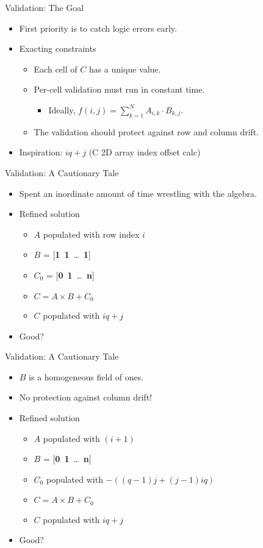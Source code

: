 \documentclass{beamer}
\begin{document}
\begin{frame}{Validation: The Goal}
  \begin{itemize}
  \item{First priority is to catch logic errors early.}
  \item{Exacting constraints}
    \begin{itemize}
    \item{Each cell of $C$ has a unique value.}
    \item{Per-cell validation must run in constant time.}
      \begin{itemize}
        \item{Ideally, $f(i,j) = \displaystyle\sum_{k=1}^{N} A_{i,k} \cdot B_{k,j}$.}
      \end{itemize}
    \item{The validation should protect against row and column drift.}
    \end{itemize}
  \item{Inspiration: $iq +j$ (C 2D array index offset calc\autocite[][113]{KnR})}
  \end{itemize}
\end{frame}
\begin{frame}{Validation: A Cautionary Tale}
  \begin{itemize}
  \item{Spent an inordinate amount of time wrestling with the algebra.}
  \item{Refined solution}
    \begin{itemize}
    \item{$A$ populated with row index $i$}
    \item{$B$ = [\textbf{1}\ \textbf{1}\ \ldots\ \textbf{1}]}
    \item{$C_{0}$ = [\textbf{0}\ \textbf{1}\ \ldots\ \textbf{n}]}
    \item{$C = A \times B + C_{0}$}
    \item{$C$ populated with $iq + j$}
    \end{itemize}
  \item{Good?}
  \end{itemize}
\end{frame}
\begin{frame}{Validation: A Cautionary Tale}
  \begin{itemize}
  \item{$B$ is a homogeneous field of ones.}
  \item{No protection against column drift!}
  \item{Refined solution}
    \begin{itemize}
    \item{$A$ populated with $(i + 1)$}
    \item{$B$ = [\textbf{0}\ \textbf{1}\ \ldots\ \textbf{n}]}
    \item{$C_{0}$ populated with $-((q-1)j + (j-1)iq)$}
    \item{$C = A \times B + C_{0}$}
    \item{$C$ populated with $iq + j$}
    \end{itemize}
  \item{Good?}
  \end{itemize}
\end{frame}
\end{document}
